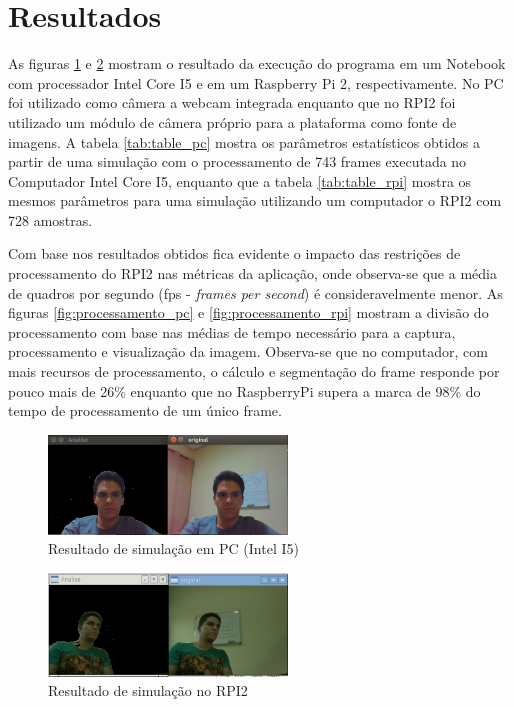 \documentclass[conference]{IEEEtran}
\begin{document}


\section{Resultados}
As figuras \ref{fig:sim_pc} e \ref{fig:sim_rpi} mostram o resultado da execução do programa em um Notebook com processador Intel Core I5 e em um Raspberry Pi 2, respectivamente. No PC foi utilizado como câmera a webcam integrada enquanto que no RPI2 foi utilizado um módulo de câmera próprio para a plataforma como fonte de imagens. A tabela \ref{tab:table_pc} mostra os parâmetros estatísticos obtidos a partir de uma simulação com o processamento de 743 frames executada no Computador Intel Core I5, enquanto que  a tabela \ref{tab:table_rpi} mostra os mesmos parâmetros para uma simulação utilizando um computador o RPI2 com 728 amostras.

Com base nos resultados obtidos fica evidente o impacto das restrições de processamento do RPI2 nas métricas da aplicação, onde observa-se que a média de quadros por segundo (fps - \textit{frames per second}) é consideravelmente menor. As figuras \ref{fig:processamento_pc} e \ref{fig:processamento_rpi} mostram a divisão do processamento com base nas médias de tempo necessário para a captura, processamento e visualização da imagem. Observa-se que no computador, com mais recursos de processamento, o cálculo e segmentação do frame responde por pouco mais de 26\% enquanto que no RaspberryPi supera a marca de 98\% do tempo de processamento de um único frame.

\begin{figure}[!t]
\centering
\includegraphics[width=2.5in]{Screen_PC_01}
\caption{Resultado de simulação em PC (Intel I5)}
\label{fig:sim_pc}
\end{figure}

\begin{figure}[!t]
\centering
\includegraphics[width=2.5in]{Screen_RPI_01}
\caption{Resultado de simulação no RPI2}
\label{fig:sim_rpi}
\end{figure}
\end{document}
